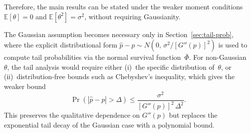 \documentclass[11pt]{article}
\begin{document}
Therefore, the main results can be stated under the weaker moment conditions $\mathbb{E}[\theta] = 0$ and $\mathbb{E}[\theta^2] = \sigma^2$, without requiring Gaussianity.

The Gaussian assumption becomes necessary only in Section~\ref{sec:tail-prob}, where the explicit distributional form $\hat{p} - p \sim N(0,\, \sigma^2/[G''(p)]^2)$ is used to compute tail probabilities via the normal survival function~$\bar{\Phi}$. For non-Gaussian~$\theta$, the tail analysis would require either (i)~the specific distribution of~$\theta$, or (ii)~distribution-free bounds such as Chebyshev's inequality, which gives the weaker bound
\[
\Pr(|\hat{p} - p| > \Delta) \leq \frac{\sigma^2}{[G''(p)]^2\,\Delta^2}.
\]
This preserves the qualitative dependence on $G''(p)$ but replaces the exponential tail decay of the Gaussian case with a polynomial bound.
\end{document}
